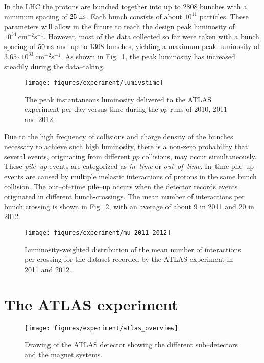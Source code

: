 In the LHC the protons are bunched together into up to 2808 bunches 
with a minimum spacing of \mbox{$25 \; \mathrm{ns}$}. 
Each bunch consists of about $10^{11}$ particles. 
These parameters will allow in the future to reach 
the design peak luminosity of \mbox{$10^{34}~\mathrm{cm^{-2}s^{-1}}$}.
However, most of the data collected so far were taken with a bunch 
spacing of \mbox{$50 \; \mathrm{ns}$} and up to 1308 bunches, yielding a maximum
peak luminosity of \mbox{$3.65\cdot{}10^{33}~\mathrm{cm^{-2}s^{-1}}$}.
As shown in Fig.~\ref{fig:lumivstime}, the peak luminosity has increased
steadily during the data--taking.

\begin{figure}[ht]\centering
\texttt{[image: figures/experiment/lumivstime]}
\caption{
The peak instantaneous luminosity delivered to the ATLAS experiment per day versus
time during the $pp$ runs of 2010, 2011 and 2012.}
\label{fig:lumivstime}
\end{figure}

Due to the high frequency of collisions and charge density of the
bunches necessary to achieve such high luminosity, there is a non-zero
probability that several events, originating from different $pp$ collisions, 
may occur simultaneously.
These {\it pile--up} events are categorized as {\it in--time} or {\it
  out--of--time}. 
In--time pile--up events are caused by  multiple inelastic interactions
of protons in the same bunch collision.
The out--of--time pile--up occurs when the detector records events
originated in different bunch-crossings.
The mean number of interactions per bunch crossing is shown in
Fig.~\ref{fig:mu}, with an average of about 9 in 2011 and 20 in 2012.

\begin{figure}[ht]\centering
\texttt{[image: figures/experiment/mu\_2011\_2012]}
\caption{
Luminosity-weighted distribution of the mean number of interactions
per crossing for the dataset recorded by the ATLAS experiment in 2011 and 2012.}
\label{fig:mu}
\end{figure}

\section{The ATLAS experiment}
\label{sec:ATLAS}

\begin{figure}[ht]
\begin{center}
\texttt{[image: figures/experiment/atlas\_overview]}
\caption[Drawing of the ATLAS detector]{
  Drawing of the ATLAS detector showing the different sub--detectors and
  the magnet systems.}
\label{fig:ATLAS}
\end{center}
\end{figure}

